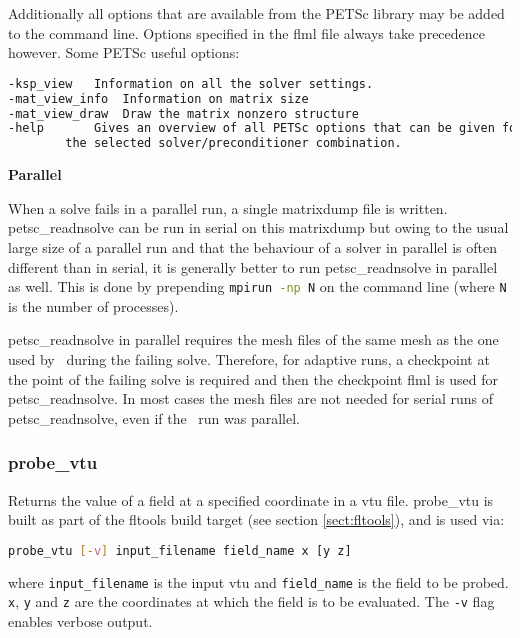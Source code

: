 Additionally all options that are available from the PETSc library may be added to the command line. Options specified in the flml file always take precedence however. Some PETSc useful options:

\begin{lstlisting}[language = Bash]
-ksp_view 	Information on all the solver settings.
-mat_view_info 	Information on matrix size
-mat_view_draw 	Draw the matrix nonzero structure
-help 		Gives an overview of all PETSc options that can be given for 
		the selected solver/preconditioner combination. 
\end{lstlisting} 

{\bf Parallel}


When a solve fails in a parallel run, a single matrixdump file is written. petsc\_readnsolve can be run in serial on this matrixdump but owing to the usual large size of a parallel run and that the behaviour of a solver in parallel is often different than in serial, it is generally better to run petsc\_readnsolve in parallel as well. This is done by prepending \lstinline[language = Bash]+mpirun -np N+ on the command line (where \lstinline[language = Bash]+N+ is the number of processes).

petsc\_readnsolve in parallel requires the mesh files of the same mesh as the one used by \fluidity\ during the failing solve. Therefore, for adaptive runs, a checkpoint at the point of the failing solve is required and then the checkpoint flml is used for petsc\_readnsolve. In most cases the mesh files are not needed for serial runs of petsc\_readnsolve, even if the \fluidity\ run was parallel.


\subsubsection{probe\_vtu}
\label{sect:probe_vtu}

Returns the value of a field at a specified coordinate in a vtu file.
probe\_vtu is built as part of the fltools
build target (see section \ref{sect:fltools}), and is used via:

\begin{lstlisting}[language = Bash]
probe_vtu [-v] input_filename field_name x [y z]
\end{lstlisting}

where \lstinline[language = Bash]+input_filename+ is the input vtu and
\lstinline[language = Bash]+field_name+ is the field to be probed. 
\lstinline[language = Bash]+x+, \lstinline[language = Bash]+y+ and
\lstinline[language = Bash]+z+ are the coordinates at which the field is to
be evaluated. The \lstinline[language = Bash]+-v+ flag enables verbose output.

